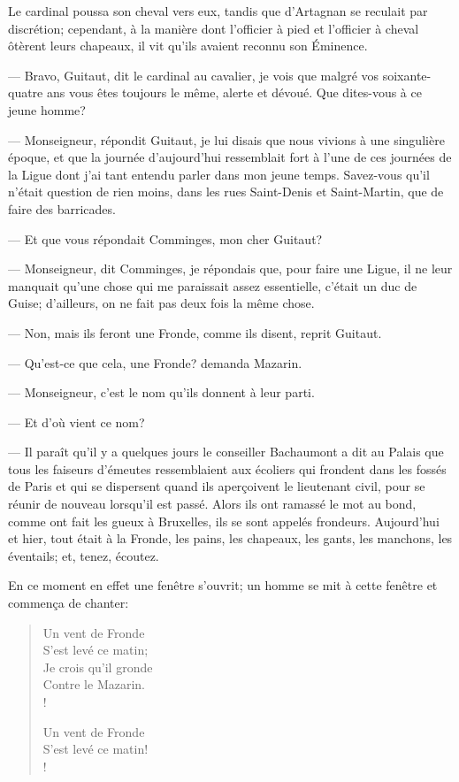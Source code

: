 Le cardinal poussa son cheval vers eux, tandis que d'Artagnan se reculait par discrétion; cependant, à la manière dont l'officier à pied et l'officier à cheval ôtèrent leurs chapeaux, il vit qu'ils avaient reconnu son Éminence.

— Bravo, Guitaut, dit le cardinal au cavalier, je vois que malgré vos soixante-quatre ans vous êtes toujours le même, alerte et dévoué. Que dites-vous à ce jeune homme?

— Monseigneur, répondit Guitaut, je lui disais que nous vivions à une singulière époque, et que la journée d'aujourd'hui ressemblait fort à l'une de ces journées de la Ligue dont j'ai tant entendu parler dans mon jeune temps. Savez-vous qu'il n'était question de rien moins, dans les rues Saint-Denis et Saint-Martin, que de faire des barricades.

— Et que vous répondait Comminges, mon cher Guitaut?

— Monseigneur, dit Comminges, je répondais que, pour faire une Ligue, il ne leur manquait qu'une chose qui me paraissait assez essentielle, c'était un duc de Guise; d'ailleurs, on ne fait pas deux fois la même chose.

— Non, mais ils feront une Fronde, comme ils disent, reprit Guitaut.

— Qu'est-ce que cela, une Fronde? demanda Mazarin.

— Monseigneur, c'est le nom qu'ils donnent à leur parti.

— Et d'où vient ce nom?

— Il paraît qu'il y a quelques jours le conseiller Bachaumont a dit au Palais que tous les faiseurs d'émeutes ressemblaient aux écoliers qui frondent dans les fossés de Paris et qui se dispersent quand ils aperçoivent le lieutenant civil, pour se réunir de nouveau lorsqu'il est passé. Alors ils ont ramassé le mot au bond, comme ont fait les gueux à Bruxelles, ils se sont appelés frondeurs. Aujourd'hui et hier, tout était à la Fronde, les pains, les chapeaux, les gants, les manchons, les éventails; et, tenez, écoutez.

En ce moment en effet une fenêtre s'ouvrit; un homme se mit à cette fenêtre et commença de chanter:

\begin{verse}\itshape
	\begin{altverse}
Un vent de Fronde\\
S'est levé ce matin;\\
Je crois qu'il gronde\\
Contre le Mazarin.\\!

Un vent de Fronde\\
S'est levé ce matin!\\!
\end{altverse}
\end{verse}

